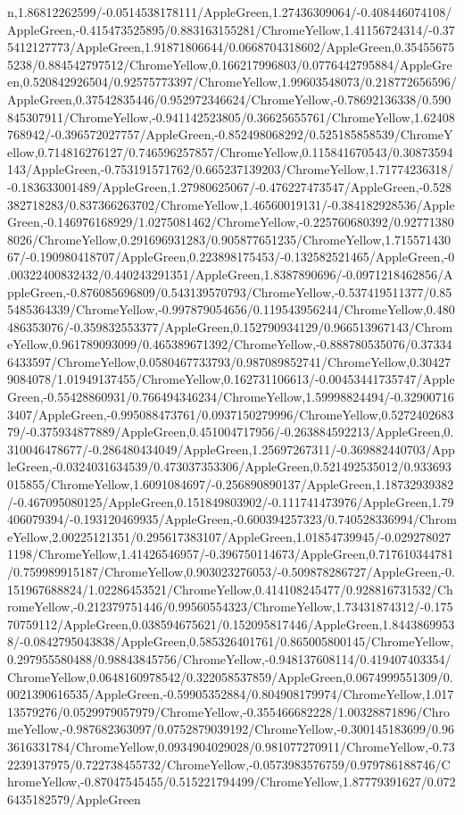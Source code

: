 {\begin{tikzternal}
n,1.86812262599/-0.0514538178111/AppleGreen,1.27436309064/-0.408446074108/AppleGreen,-0.415473525895/0.883163155281/ChromeYellow,1.41156724314/-0.375412127773/AppleGreen,1.91871806644/0.0668704318602/AppleGreen,0.354556755238/0.884542797512/ChromeYellow,0.166217996803/0.0776442795884/AppleGreen,0.520842926504/0.92575773397/ChromeYellow,1.99603548073/0.218772656596/AppleGreen,0.37542835446/0.952972346624/ChromeYellow,-0.78692136338/0.590845307911/ChromeYellow,-0.941142523805/0.36625655761/ChromeYellow,1.62408768942/-0.396572027757/AppleGreen,-0.852498068292/0.525185858539/ChromeYellow,0.714816276127/0.746596257857/ChromeYellow,0.115841670543/0.30873594143/AppleGreen,-0.753191571762/0.665237139203/ChromeYellow,1.71774236318/-0.183633001489/AppleGreen,1.27980625067/-0.476227473547/AppleGreen,-0.528382718283/0.837366263702/ChromeYellow,1.46560019131/-0.384182928536/AppleGreen,-0.146976168929/1.0275081462/ChromeYellow,-0.225760680392/0.927713808026/ChromeYellow,0.291696931283/0.905877651235/ChromeYellow,1.71557143067/-0.190980418707/AppleGreen,0.223898175453/-0.132582521465/AppleGreen,-0.00322400832432/0.440243291351/AppleGreen,1.8387890696/-0.0971218462856/AppleGreen,-0.876085696809/0.543139570793/ChromeYellow,-0.537419511377/0.855485364339/ChromeYellow,-0.997879054656/0.119543956244/ChromeYellow,0.480486353076/-0.359832553377/AppleGreen,0.152790934129/0.966513967143/ChromeYellow,0.961789093099/0.465389671392/ChromeYellow,-0.888780535076/0.373346433597/ChromeYellow,0.0580467733793/0.987089852741/ChromeYellow,0.304279084078/1.01949137455/ChromeYellow,0.162731106613/-0.00453441735747/AppleGreen,-0.55428860931/0.766494346234/ChromeYellow,1.59998824494/-0.329007163407/AppleGreen,-0.995088473761/0.0937150279996/ChromeYellow,0.527240268379/-0.375934877889/AppleGreen,0.451004717956/-0.263884592213/AppleGreen,0.310046478677/-0.286480434049/AppleGreen,1.25697267311/-0.369882440703/AppleGreen,-0.0324031634539/0.473037353306/AppleGreen,0.521492535012/0.933693015855/ChromeYellow,1.6091084697/-0.256890890137/AppleGreen,1.18732939382/-0.467095080125/AppleGreen,0.151849803902/-0.111741473976/AppleGreen,1.79406079394/-0.193120469935/AppleGreen,-0.600394257323/0.740528336994/ChromeYellow,2.00225121351/0.295617383107/AppleGreen,1.01854739945/-0.0292780271198/ChromeYellow,1.41426546957/-0.396750114673/AppleGreen,0.717610344781/0.759989915187/ChromeYellow,0.903023276053/-0.509878286727/AppleGreen,-0.151967688824/1.02286453521/ChromeYellow,0.414108245477/0.928816731532/ChromeYellow,-0.212379751446/0.99560554323/ChromeYellow,1.73431874312/-0.17570759112/AppleGreen,0.038594675621/0.152095817446/AppleGreen,1.84438699538/-0.0842795043838/AppleGreen,0.585326401761/0.865005800145/ChromeYellow,0.297955580488/0.98843845756/ChromeYellow,-0.948137608114/0.419407403354/ChromeYellow,0.0648160978542/0.322058537859/AppleGreen,0.0674999551309/0.0021390616535/AppleGreen,-0.59905352884/0.804908179974/ChromeYellow,1.01713579276/0.0529979057979/ChromeYellow,-0.355466682228/1.00328871896/ChromeYellow,-0.987682363097/0.0752879039192/ChromeYellow,-0.300145183699/0.963616331784/ChromeYellow,0.0934904029028/0.981077270911/ChromeYellow,-0.732239137975/0.722738455732/ChromeYellow,-0.0573983576759/0.979786188746/ChromeYellow,-0.87047545455/0.515221794499/ChromeYellow,1.87779391627/0.0726435182579/AppleGreen
\end{tikzternal}}
